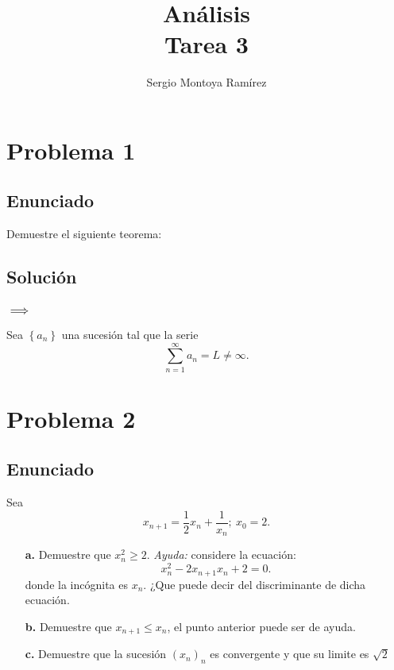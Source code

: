 \documentclass{report}
\title{\Huge{Análisis}\\Tarea 3}
\author{\huge{Sergio Montoya Ramírez}}
\date{}
\begin{document}
\maketitle
\newpage%
\tableofcontents
\pagebreak

\chapter{Problema 1}
\section{Enunciado}
Demuestre el siguiente teorema:
\section{Solución}
\subsection{$\implies$}

Sea $\left\{ a_n \right\} $ una sucesión tal que la serie \[
\displaystyle \sum_{n=1}^{\infty} a_n = L \neq \infty
.\] 

\chapter{Problema 2}
\section{Enunciado}
Sea \[
x_{n+1} = \frac{1}{2}x_n + \frac{1}{x_n};\ x_0 = 2
.\] 
\begin{enumerate}
  \item[\textbf{a.}] Demuestre que $x_n^2\ge 2$. \textit{Ayuda:} considere la ecuación: \[
  x_n^2 - 2x_{n+1}x_n + 2 = 0
.\] donde la incógnita es $x_n$. ¿Que puede decir del discriminante de dicha ecuación.
  \item[\textbf{b.}] Demuestre que $x_{n+1}\le x_n$, el punto anterior puede ser de ayuda.
  \item[\textbf{c.}] Demuestre que la sucesión $\left( x_n \right)_n$ es convergente y que su limite es $\sqrt{2} $
\end{enumerate}
\end{document}
